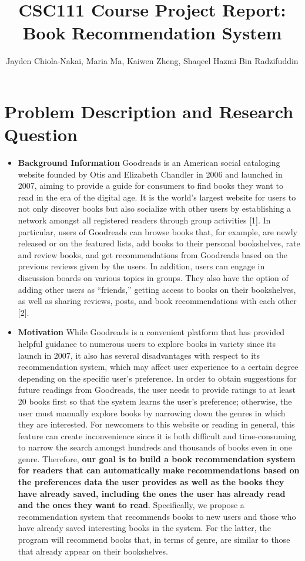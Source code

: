 \documentclass[fontsize=11pt]{article}
\title{CSC111 Course Project Report: Book Recommendation System}
\author{Jayden Chiola-Nakai, Maria Ma, Kaiwen Zheng, Shaqeel Hazmi Bin Radzifuddin}
\begin{document}
\maketitle

\section*{Problem Description and Research Question}

\begin{itemize}
\item \textbf{Background Information }Goodreads is an American social cataloging website founded by Otis and Elizabeth Chandler in 2006 and launched in 2007, aiming to provide a guide for consumers to find books they want to read in the era of the digital age. It is the world’s largest website for users to not only discover books but also socialize with other users by establishing a network amongst all registered readers through group activities [1]. In particular, users of Goodreads can browse books that, for example, are newly released or on the featured lists, add books to their personal bookshelves, rate and review books, and get recommendations from Goodreads based on the previous reviews given by the users. In addition, users can engage in discussion boards on various topics in groups. They also have the option of adding other users as “friends,” getting access to books on their bookshelves, as well as sharing reviews, posts, and book recommendations with each other [2].

\item \textbf{Motivation }While Goodreads is a convenient platform that has provided helpful guidance to numerous users to explore books in variety since its launch in 2007, it also has several disadvantages with respect to its recommendation system, which may affect user experience to a certain degree depending on the specific user’s preference. In order to obtain suggestions for future readings from Goodreads, the user needs to provide ratings to at least 20 books first so that the system learns the user’s preference; otherwise, the user must manually explore books by narrowing down the genres in which they are interested. For newcomers to this website or reading in general, this feature can create inconvenience since it is both difficult and time-consuming to narrow the search amongst hundreds and thousands of books even in one genre. Therefore, \textbf{our goal is to build a book recommendation system for readers that can automatically make recommendations based on the preferences data the user provides as well as the books they have already saved, including the ones the user has already read and the ones they want to read}. Specifically, we propose a recommendation system that recommends books to new users and those who have already saved interesting books in the system. For the latter, the program will recommend books that, in terms of genre, are similar to those that already appear on their bookshelves.
\end{itemize}
\end{document}
